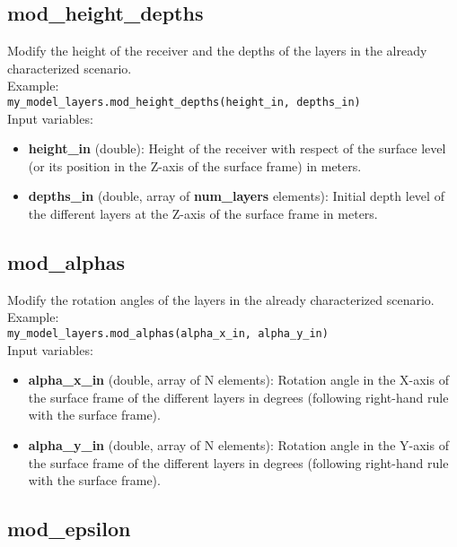 \subsection{mod\_height\_depths}

Modify the height of the receiver and the depths of the layers in the already characterized scenario.\\

Example:\\

\texttt{my\_model\_layers.mod\_height\_depths(height\_in, depths\_in)}\\

Input variables:
\begin{itemize}
\item {\bf height\_in} (double): Height of the receiver with respect of the surface level (or its position in the Z-axis of the surface frame) in meters.
\item {\bf depths\_in} (double, array of {\bf num\_layers} elements): Initial depth level of the different layers at the Z-axis of the surface frame in meters.
\end{itemize}


\subsection{mod\_alphas}

Modify the rotation angles of the layers in the already characterized scenario.\\

Example:\\

\texttt{my\_model\_layers.mod\_alphas(alpha\_x\_in, alpha\_y\_in)}\\

Input variables:
\begin{itemize}
\item {\bf alpha\_x\_in} (double, array of N elements): Rotation angle in the X-axis of the surface frame of the different layers in degrees (following right-hand rule with the surface frame).
\item {\bf alpha\_y\_in} (double, array of N elements): Rotation angle in the Y-axis of the surface frame of the different layers in degrees (following right-hand rule with the surface frame).
\end{itemize}


\subsection{mod\_epsilon}

